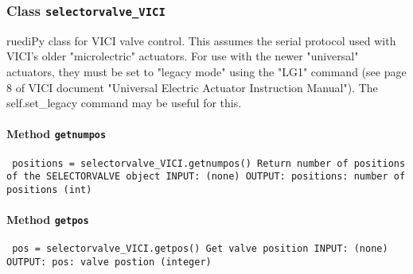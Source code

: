 \subsubsection{Class \texttt{selectorvalve_VICI}}
\par
ruediPy class for VICI valve control. This assumes the serial protocol used with VICI's older "microlectric" actuators. For use with the newer "universal" actuators, they must be set to "legacy mode" using the "LG1" command (see page 8 of VICI document "Universal Electric Actuator Instruction Manual"). The self.set_legacy command may be useful for this.\par

\paragraph{Method \texttt{getnumpos}}
\vspace{1ex}
\texttt{\newline
positions = selectorvalve_VICI.getnumpos()\newline
\newline
Return number of positions of the SELECTORVALVE object\newline
\newline
INPUT:\newline
(none)\newline
\newline
OUTPUT:\newline
positions: number of positions (int)\newline
\newline
}

\paragraph{Method \texttt{getpos}}
\vspace{1ex}
\texttt{\newline
pos = selectorvalve_VICI.getpos()\newline
\newline
Get valve position\newline
\newline
INPUT:\newline
(none)\newline
\newline
OUTPUT:\newline
pos: valve postion (integer)\newline
\newline
}


